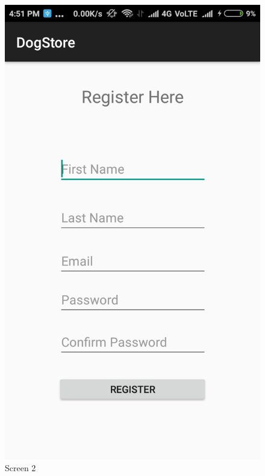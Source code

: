 \begin{figure}[ht]
\centering
\includegraphics[scale=0.30]{images/2.png}
\caption{Screen 2}
\end{figure}

\newpage

